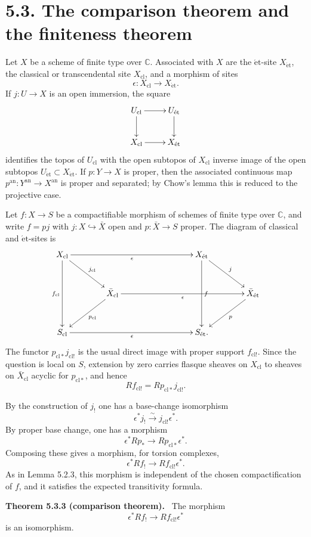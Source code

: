 \documentclass[12pt]{article}
\newcommand{\C}{\mathbb C}
\newcommand{\et}{\mathrm{\acute et}}
\newcommand{\cl}{\mathrm{cl}}
\newcommand{\an}{\mathrm{an}}
\newenvironment{statement}[1]{\par\medskip\noindent\textbf{#1.}\ }{\par\medskip}
\begin{document}
\section*{5.3. The comparison theorem and the finiteness theorem}

Let \(X\) be a scheme of finite type over \(\C\). Associated with \(X\) are the \(\et\)-site \(X_{\et}\), the classical or transcendental site \(X_{\cl}\), and a morphism of sites
\[
\epsilon:X_{\cl}\longrightarrow X_{\et}.
\]
If \(j:U\to X\) is an open immersion, the square
\[
\xymatrix{
U_{\cl}\ar[r]\ar[d]&U_{\et}\ar[d]\\
X_{\cl}\ar[r]&X_{\et}
}
\]
identifies the topos of \(U_{\cl}\) with the open subtopos of \(X_{\cl}\) inverse image of the open subtopos \(U_{\et}\subset X_{\et}\). If \(p:Y\to X\) is proper, then the associated continuous map \(p^{\an}:Y^{\an}\to X^{\an}\) is proper and separated; by Chow's lemma this is reduced to the projective case.

Let \(f:X\to S\) be a compactifiable morphism of schemes of finite type over \(\C\), and write \(f=pj\) with \(j:X\hookrightarrow \bar X\) open and \(p:\bar X\to S\) proper. The diagram of classical and \(\et\)-sites is
\[
\xymatrix@C=1.4cm@R=1.1cm{
X_{\cl}\ar[rrr]_{\epsilon}\ar[rd]^{j_{\cl}}\ar[dd]_{f_{\cl}} &&& X_{\et}\ar[rd]^j\ar[dd]^f\\
&\bar X_{\cl}\ar[ld]^{p_{\cl}}\ar[rrr]_{\epsilon}&&&\bar X_{\et}\ar[ld]^p\\
S_{\cl}\ar[rrr]_{\epsilon}&&&S_{\et}. 
}
\]
The functor \(p_{\cl*}j_{\cl!}\) is the usual direct image with proper support \(f_{\cl!}\). Since the question is local on \(S\), extension by zero carries flasque sheaves on \(X_{\cl}\) to sheaves on \(\bar X_{\cl}\) acyclic for \(p_{\cl*}\), and hence
\[
Rf_{\cl!}=Rp_{\cl*}j_{\cl!}.
\]

By the construction of \(j_!\) one has a base-change isomorphism
\[
\epsilon^*j_!\xrightarrow{\sim} j_{\cl!}\epsilon^*.
\]
By proper base change, one has a morphism
\[
\epsilon^*Rp_*\longrightarrow Rp_{\cl*}\epsilon^*.
\]
Composing these gives a morphism, for torsion complexes,
\[
\epsilon^*Rf_!\longrightarrow Rf_{\cl!}\epsilon^*.
\]
As in Lemma 5.2.3, this morphism is independent of the chosen compactification of \(f\), and it satisfies the expected transitivity formula.

\begin{statement}{Theorem 5.3.3 (comparison theorem)}
The morphism
\[
\epsilon^*Rf_!\longrightarrow Rf_{\cl!}\epsilon^*
\]
is an isomorphism.
\end{statement}
\end{document}
